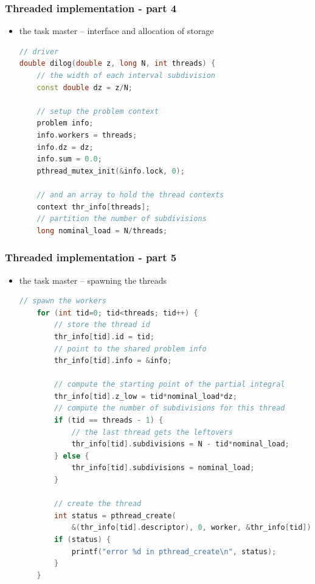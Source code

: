 \begin{frame}[fragile]
%
  \frametitle{Threaded implementation - part 4}
%
  \begin{itemize}
  \item the task master -- interface and allocation of storage
  \begin{lstlisting}[language=c++,name=threaded]
// driver
double dilog(double z, long N, int threads) {
    // the width of each interval subdivision
    const double dz = z/N;

    // setup the problem context
    problem info;
    info.workers = threads;
    info.dz = dz;
    info.sum = 0.0;
    pthread_mutex_init(&info.lock, 0);

    // and an array to hold the thread contexts
    context thr_info[threads];
    // partition the number of subdivisions
    long nominal_load = N/threads;

  \end{lstlisting}
%
  \end{itemize}
%
\end{frame}

\begin{frame}[fragile]
%
  \frametitle{Threaded implementation - part 5}
%
  \begin{itemize}
  \item the task master -- spawning the threads
  \begin{lstlisting}[language=c++,name=threaded]
    // spawn the workers
    for (int tid=0; tid<threads; tid++) {
        // store the thread id
        thr_info[tid].id = tid;
        // point to the shared problem info
        thr_info[tid].info = &info;

        // compute the starting point of the partial integral
        thr_info[tid].z_low = tid*nominal_load*dz;
        // compute the number of subdivisions for this thread
        if (tid == threads - 1) {
            // the last thread gets the leftovers
            thr_info[tid].subdivisions = N - tid*nominal_load;
        } else {
            thr_info[tid].subdivisions = nominal_load;
        }

        // create the thread
        int status = pthread_create(
            &(thr_info[tid].descriptor), 0, worker, &thr_info[tid]);
        if (status) {
            printf("error %d in pthread_create\n", status);
        }
    }
  \end{lstlisting}
%
  \end{itemize}
%
\end{frame}

